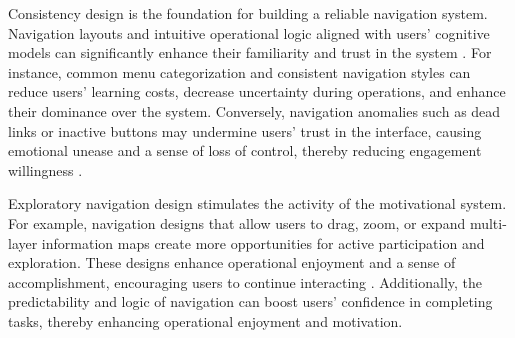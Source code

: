 Consistency design is the foundation for building a reliable navigation system. Navigation layouts and intuitive operational logic aligned with users’ cognitive models can significantly enhance their familiarity and trust in the system \cite{abdelaal2023accessibility}. For instance, common menu categorization and consistent navigation styles can reduce users’ learning costs, decrease uncertainty during operations, and enhance their dominance over the system. Conversely, navigation anomalies such as dead links or inactive buttons may undermine users’ trust in the interface, causing emotional unease and a sense of loss of control, thereby reducing engagement willingness \cite{sheng2012effects}.

Exploratory navigation design stimulates the activity of the motivational system. For example, navigation designs that allow users to drag, zoom, or expand multi-layer information maps create more opportunities for active participation and exploration. These designs enhance operational enjoyment and a sense of accomplishment, encouraging users to continue interacting \cite{amoor2014designing}. Additionally, the predictability and logic of navigation can boost users’ confidence in completing tasks, thereby enhancing operational enjoyment and motivation.


